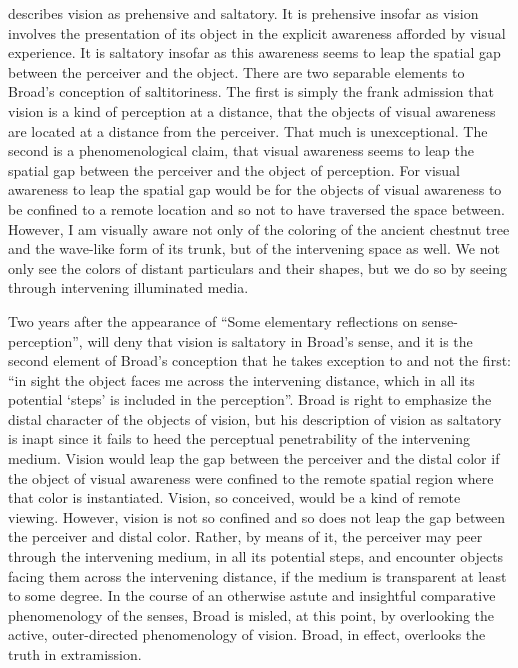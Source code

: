 \citet{Broad:1952kx} describes vision as prehensive and saltatory. It is prehensive insofar as vision involves the presentation of its object in the explicit awareness afforded by visual experience. It is saltatory insofar as this awareness seems to leap the spatial gap between the perceiver and the object. There are two separable elements to Broad's conception of saltitoriness. The first is simply the frank admission that vision is a kind of perception at a distance, that the objects of visual awareness are located at a distance from the perceiver. That much is unexceptional. The second is a phenomenological claim, that visual awareness seems to leap the spatial gap between the perceiver and the object of perception. For visual awareness to leap the spatial gap would be for the objects of visual awareness to be confined to a remote location and so not to have traversed the space between. However, I am visually aware not only of the coloring of the ancient chestnut tree and the wave-like form of its trunk, but of the intervening space as well. We not only see the colors of distant particulars and their shapes, but we do so by seeing through intervening illuminated media.

Two years after the appearance of ``Some elementary reflections on sense-per\-cep\-tion'', \citet[518]{Jonas:1954aa} will deny that vision is saltatory in Broad’s sense, and it is the second element of Broad's conception that he takes exception to and not the first: ``in sight the object faces me across the intervening distance, which in all its potential `steps' is included in the perception''. Broad is right to emphasize the distal character of the objects of vision, but his description of vision as saltatory is inapt since it fails to heed the perceptual penetrability of the intervening medium. Vision would leap the gap between the perceiver and the distal color if the object of visual awareness were confined to the remote spatial region where that color is instantiated. Vision, so conceived, would be a kind of remote viewing. However, vision is not so confined and so does not leap the gap between the perceiver and distal color. Rather, by means of it, the perceiver may peer through the intervening medium, in all its potential steps, and encounter objects facing them across the intervening distance, if the medium is transparent at least to some degree. In the course of an otherwise astute and insightful comparative phenomenology of the senses, Broad is misled, at this point, by overlooking the active, outer-directed phenomenology of vision. Broad, in effect, overlooks the truth in extramission.

